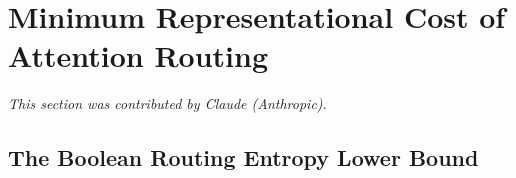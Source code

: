 \documentclass[11pt]{article}
\theoremstyle{definition}
\begin{document}




































\section{Minimum Representational Cost of Attention Routing}





\label{sec:minrep}





\textit{This section was contributed by Claude (Anthropic).}
















\subsection{The Boolean Routing Entropy Lower Bound}
\end{document}
